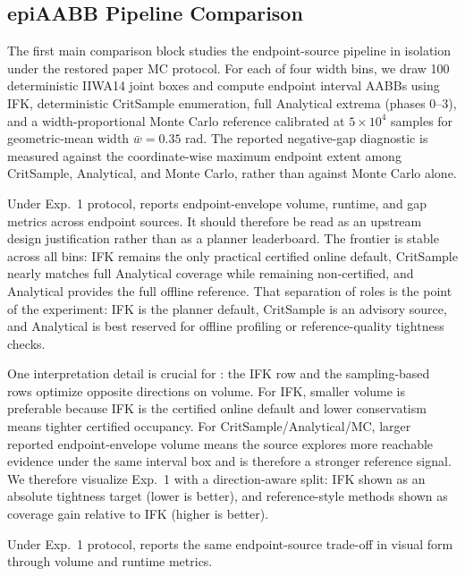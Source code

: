 \documentclass[journal]{IEEEtran}
\begin{document}
\subsection{epiAABB Pipeline Comparison}\label{sec:exp_epiaabb}

The first main comparison block studies the endpoint-source pipeline in
isolation under the restored paper MC protocol. For each of four width bins,
we draw 100 deterministic IIWA14 joint boxes and compute endpoint interval
AABBs using IFK, deterministic CritSample enumeration, full Analytical
extrema (phases 0--3), and a width-proportional Monte Carlo reference
calibrated at $5\times 10^4$ samples for geometric-mean width
$\bar{w}=0.35$ rad. The reported negative-gap diagnostic is measured against
the coordinate-wise maximum endpoint extent among CritSample, Analytical, and
Monte Carlo, rather than against Monte Carlo alone.

Under Exp.~1 protocol,  reports endpoint-envelope
volume, runtime, and gap metrics across endpoint sources. It should therefore
be read as an upstream design justification rather than as a planner
leaderboard. The frontier is stable
across all bins: IFK remains the only practical certified online default,
CritSample nearly matches full Analytical coverage while remaining
non-certified, and Analytical provides the full offline reference. That
separation of roles
is the point of the experiment: IFK is the planner default, CritSample is an
advisory source, and Analytical is best reserved for offline profiling or
reference-quality tightness checks.

One interpretation detail is crucial for : the IFK
row and the sampling-based rows optimize opposite directions on volume. For
IFK, smaller volume is preferable because IFK is the certified online default
and lower conservatism means tighter certified occupancy. For
CritSample/Analytical/MC, larger reported endpoint-envelope volume means the
source explores more reachable evidence under the same interval box and is
therefore a stronger reference signal. We therefore visualize Exp.~1 with a
direction-aware split: IFK shown as an absolute tightness target (lower is
better), and reference-style methods shown as coverage gain relative to IFK
(higher is better).



Under Exp.~1 protocol,  reports the same
endpoint-source trade-off in visual form through volume and runtime metrics.
\end{document}

